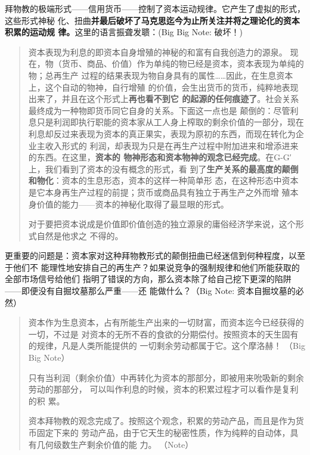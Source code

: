 拜物教的极端形式——信用货币——控制了资本运动规律。它产生了虚拟的形式，这些形式神秘
化、扭曲\textbf{并最后破坏了马克思迄今为止所关注并将之理论化的资本积累的运动规
律。}这里的语言振聋发聩：(Big Big Note: 破坏！)

\begin{quotation}资本表现为利息的即资本自身增殖的神秘的和富有自我创造力的源泉。
现在，物（货币、商品、价值）作为单纯的物已经是资本，资本表现为单纯的物；总再生产
过程的结果表现为物自身具有的属性……因此，在生息资本上，这个自动的物神，自行增殖
的价值，会生出货币的货币，纯粹地表现出来了，并且在这个形式上\textbf{再也看不到它
的起源的任何痕迹了}。社会关系最终成为一种物即货币同它自身的关系。下面这一点也是
颠倒的：尽管利息只是利润即执行职能的资本家从工人身上榨取的剩余价值的一部分，现在
利息却反过来表现为资本的真正果实，表现为原初的东西，而现在转化为企业主收入形式的
利润，却表现为只是在再生产过程中附加进来和增添进来的东西。在这里，\textbf{资本的
物神形态和资本物神的观念已经完成}。在G-G′上，我们看到了资本的没有概念的形式，看
到了\textbf{生产关系的最高度的颠倒和物化}：资本的生息形态，资本的这样一种简单形
态，在这种形态中资本是它本身再生产过程的前提；货币或商品具有独立于再生产之外而增
殖本身价值的能力——资本的神秘化取得了最显眼的形式。

对于要把资本说成是价值即价值创造的独立源泉的庸俗经济学来说，这个形式自然是他求之
不得的。

\end{quotation}

更重要的问题是：资本家对这种拜物教形式的颠倒扭曲已经迷信到何种程度，以至于他们不
能理性地安排自己的再生产？如果说竞争的强制规律和他们所能获取的全部市场信号给他们
指明了错误的方向，那么资本除了给自己挖下更深的陷阱——即便没有自掘坟墓那么严重——还
能做什么？（Big Note: 资本自掘坟墓的必然）

\begin{quotation}
  资本作为生息资本，占有所能生产出来的一切财富，而资本迄今已经获得的一切，不过是
  对资本的无所不吞的食欲的分期偿付。按照资本的天生固有的规律，凡是人类所能提供的
  一切剩余劳动都属于它。这个摩洛赫！ （Big Big Note）


  只有当利润（剩余价值）中再转化为资本的那部分，即被用来吮吸新的剩余劳动的那部分，
  可以叫作利息的时候，资本的积累过程才可以看作是复利的积
  累。

  资本拜物教的观念完成了。按照这个观念，积累的劳动产品，而且是作为货币固定下来的
  劳动产品，由于它天生的秘密性质，作为纯粹的自动体，具有几何级数生产剩余价值的能
  力。  （Note）

\end{quotation}

